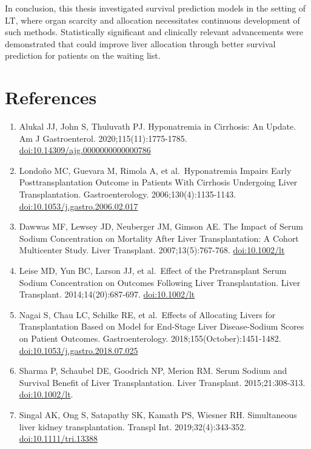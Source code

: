 \documentclass[11pt,english,]{book} %
\providecommand{\tightlist}{%
  \setlength{\itemsep}{0pt}\setlength{\parskip}{0pt}}
\begin{document}
In conclusion, this thesis investigated survival prediction models in the setting of LT, where organ scarcity and allocation necessitates continuous development of such methods. Statistically significant and clinically relevant advancements were demonstrated that could improve liver allocation through better survival prediction for patients on the waiting list.

\newpage
\linespread{1}
\small


\hypertarget{references-6}{%
\section*{References}\label{references-6}}

\begin{enumerate}
\def\labelenumi{\arabic{enumi}.}
\tightlist
\item
  Alukal JJ, John S, Thuluvath PJ. Hyponatremia in Cirrhosis: An Update. Am J Gastroenterol. 2020;115(11):1775-1785. \url{doi:10.14309/ajg.0000000000000786}
\item
  Londoño MC, Guevara M, Rimola A, et al.~Hyponatremia Impairs Early Posttransplantation Outcome in Patients With Cirrhosis Undergoing Liver Transplantation. Gastroenterology. 2006;130(4):1135-1143. \url{doi:10.1053/j.gastro.2006.02.017}
\item
  Dawwas MF, Lewsey JD, Neuberger JM, Gimson AE. The Impact of Serum Sodium Concentration on Mortality After Liver Transplantation: A Cohort Multicenter Study. Liver Transplant. 2007;13(5):767-768. \url{doi:10.1002/lt}
\item
  Leise MD, Yun BC, Larson JJ, et al.~Effect of the Pretransplant Serum Sodium Concentration on Outcomes Following Liver Transplantation. Liver Transplant. 2014;14(20):687-697. \url{doi:10.1002/lt}
\item
  Nagai S, Chau LC, Schilke RE, et al.~Effects of Allocating Livers for Transplantation Based on Model for End-Stage Liver Disease-Sodium Scores on Patient Outcomes. Gastroenterology. 2018;155(October):1451-1482. \url{doi:10.1053/j.gastro.2018.07.025}
\item
  Sharma P, Schaubel DE, Goodrich NP, Merion RM. Serum Sodium and Survival Benefit of Liver Transplantation. Liver Transplant. 2015;21:308-313. \url{doi:10.1002/lt}.
\item
  Singal AK, Ong S, Satapathy SK, Kamath PS, Wiesner RH. Simultaneous liver kidney transplantation. Transpl Int. 2019;32(4):343-352. \url{doi:10.1111/tri.13388}

\end{enumerate}
\end{document}
